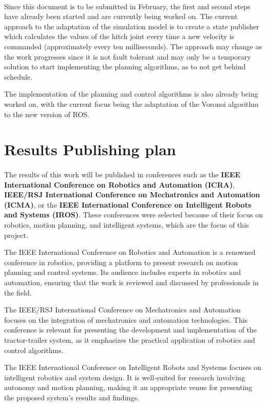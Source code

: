 \paragraph{}Since this document is to be submitted in February, the first and second steps have already been started 
and are currently being worked on. The current approach to the adaptation of the simulation model is to create a 
state publisher which calculates the values of the hitch joint every time a new velocity is commanded (approximately 
every ten milliseconds). The approach may change as the work progresses since it is not fault tolerant and may only be 
a temporary solution to start implementing the planning algorithms, as to not get behind schedule.

The implementation of the planning and control algorithms is also already being worked on, with the current focus 
being the adaptation of the Voronoi algorithm to the new version of ROS.
\section{Results Publishing plan}
\label{sec:resultsplan}
\paragraph{}The results of this work will be published in conferences such as the \textbf{IEEE International Conference on Robotics 
and Automation (ICRA)}, \textbf{IEEE/RSJ International Conference on Mechatronics and Automation (ICMA)}, or the 
\textbf{IEEE International Conference on Intelligent Robots and Systems (IROS)}. These conferences were 
selected because of their focus on robotics, motion planning, and intelligent systems, which are the focus of this project.

The IEEE International Conference on Robotics and Automation is a renowned conference in robotics, 
providing a platform to present research on motion planning and control systems. Its audience includes experts 
in robotics and automation, ensuring that the work is reviewed and discussed by professionals in the field.

The IEEE/RSJ International Conference on Mechatronics and Automation focuses on the integration of mechatronics 
and automation technologies. This conference is relevant for presenting the development and implementation of the 
tractor-trailer system, as it emphasizes the practical application of robotics and control algorithms.

The IEEE International Conference on Intelligent Robots and Systems focuses on intelligent robotics and system 
design. It is well-suited for research involving autonomy and motion planning, making it an appropriate venue for presenting 
the proposed system’s results and findings.

